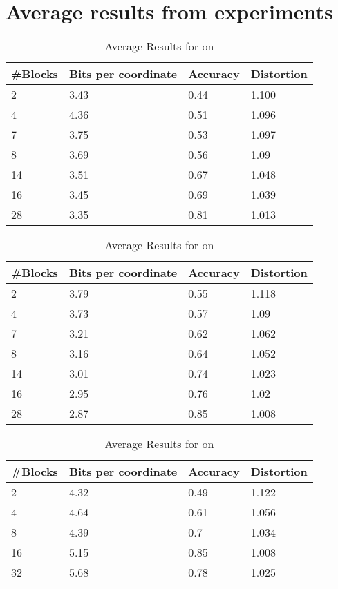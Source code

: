 \section{Average results from experiments}
\label{app:a}
\begin{table}[h]
	\centering
	\caption{Average Results for \qs{} on \mnist{}}
	\label{table:avg_mnist_qs2}
	\begin{tabular}{l l l l}
		\hline
		\#Blocks & Bits per coordinate & Accuracy  & Distortion \\ \hline
		2 & 3.43 & 0.44 & 1.100  \\
		4 & 4.36 & 0.51 & 1.096  \\
		7 & 3.75 & 0.53 & 1.097 \\
		8 & 3.69 & 0.56 & 1.09 \\
		14 & 3.51 & 0.67 & 1.048 \\
		16 & 3.45 & 0.69 & 1.039 \\
		28 & 3.35 & 0.81 & 1.013 \\
		\hline
	\end{tabular}
\end{table}

\begin{table}[h]
	\centering
	\caption{Average Results for \qsr{} on  \mnist{}}
	\label{table:avg_mnist_qsr2}
	\begin{tabular}{l l l l}
		\hline
		\#Blocks & Bits per coordinate & Accuracy  & Distortion \\ \hline
		2 & 3.79 & 0.55 & 1.118  \\
		4 & 3.73 & 0.57 & 1.09  \\
		7 & 3.21 & 0.62 & 1.062 \\
		8 & 3.16 & 0.64 & 1.052 \\
		14 & 3.01 & 0.74 & 1.023 \\
		16 & 2.95 & 0.76 & 1.02 \\
		28 & 2.87 & 0.85 & 1.008 \\
		\hline
	\end{tabular}
\end{table}


\begin{table}[h!]
	\centering
	\caption{Average Results for \qs{} on \sift{}}
	\label{table:avg_sift_qs}
	\begin{tabular}{l l l l}
		\hline
		\#Blocks & Bits per coordinate & Accuracy  & Distortion \\ \hline
		2 & 4.32 & 0.49 & 1.122  \\
		4 & 4.64 & 0.61 & 1.056  \\
		8 & 4.39 & 0.7 & 1.034 \\
		16 & 5.15 & 0.85 & 1.008 \\
		32 & 5.68 & 0.78 & 1.025 \\
		\hline
	\end{tabular}
\end{table}

